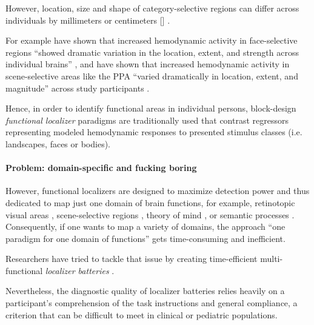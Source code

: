However, location, size and shape of category-selective regions can differ
across individuals by millimeters or centimeters [\citep{zhen2017quantifying,
zhen2015quantifying}] \citep{feilong2018reliable}.



For example \citet{zhen2015quantifying} have shown that increased hemodynamic
activity in face-selective regions ``showed dramatic variation in the location,
extent, and strength across individual brains'' \citep{zhen2015quantifying}, and
\citet{zhen2017quantifying} have shown that increased hemodynamic activity in
scene-selective areas like the PPA ``varied dramatically in location, extent,
and magnitude'' across study participants \citep{zhen2017quantifying}.

Hence, in order to identify functional areas in individual persons, block-design
\textit{functional localizer} paradigms are traditionally used that contrast
regressors representing modeled hemodynamic responses to presented stimulus
classes (i.e. landscapes, faces or bodies).



\paragraph{Problem: domain-specific and fucking boring}

However, functional localizers are designed to maximize detection power and thus
dedicated to map just one domain of brain functions, for example, retinotopic
visual areas \citep{wang2015probabilistic}, scene-selective regions
\citep{stigliani2015temporal}, theory of mind \citep{spunt2014validating}, or
semantic processes \citep{fernandez2001language}.
Consequently, if one wants to map a variety of domains, the approach ``one
paradigm for one domain of functions'' gets time-consuming and inefficient.


Researchers have tried to tackle that issue by creating time-efficient
multi-functional \textit{localizer batteries} \citep[e.g.,][]{barch2013function,
drobyshevsky2006rapid, pinel2007fast}.

Nevertheless, the diagnostic quality of localizer batteries relies heavily on
a participant's comprehension of the task instructions and general compliance,
a criterion that can be difficult to meet in clinical or pediatric populations.



